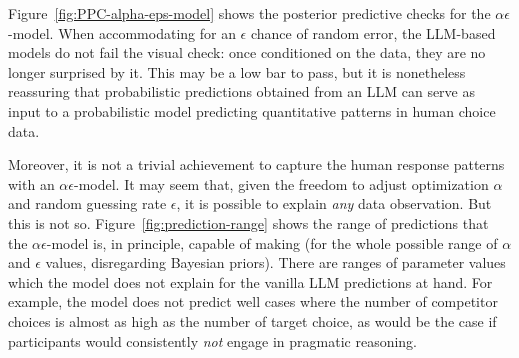 \documentclass{article}
\begin{document}
Figure~\ref{fig:PPC-alpha-eps-model} shows the posterior predictive checks for the \(\alpha\epsilon\)-model.
When accommodating for an \(\epsilon\) chance of random error, the LLM-based models do not fail the visual check: once conditioned on the data, they are no longer surprised by it.
This may be a low bar to pass, but it is nonetheless reassuring that probabilistic predictions obtained from an LLM can serve as input to a probabilistic model predicting quantitative patterns in human choice data.

Moreover, it is not a trivial achievement to capture the human response patterns with an $\alpha\epsilon$-model.
It may seem that, given the freedom to adjust optimization $\alpha$ and random guessing rate $\epsilon$, it is possible to explain \emph{any} data observation.
But this is not so.
Figure~\ref{fig:prediction-range} shows the range of predictions that the $\alpha\epsilon$-model is, in principle, capable of making (for the whole possible range of \(\alpha\) and \(\epsilon\) values, disregarding Bayesian priors).
There are ranges of parameter values which the model does not explain for the vanilla LLM predictions at hand.
For example, the model does not predict well cases where the number of competitor choices is almost as high as the number of target choice, as would be the case if participants would consistently \emph{not} engage in pragmatic reasoning.
\end{document}
